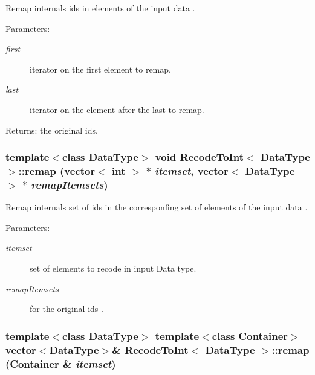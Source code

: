 Remap internals ids in elements of the input data . 

\begin{Desc}
\item[Parameters:]
\begin{description}
\item[{\em first}]iterator on the first element to remap. \item[{\em last}]iterator on the element after the last to remap. \end{description}
\end{Desc}
\begin{Desc}
\item[Returns:]the original ids. \end{Desc}
\subsubsection{\setlength{\rightskip}{0pt plus 5cm}template$<$class Data\-Type$>$ void {\bf Recode\-To\-Int}$<$ Data\-Type $>$::remap (vector$<$ int $>$ $\ast$ {\em itemset}, vector$<$ Data\-Type $>$ $\ast$ {\em remap\-Itemsets})\hspace{0.3cm}{\tt  [inline]}}\label{class_recode_to_int_8dcffed515a66b6a64c837933dca615e}


Remap internals set of ids in the corresponfing set of elements of the input data . 

\begin{Desc}
\item[Parameters:]
\begin{description}
\item[{\em itemset}]set of elements to recode in input Data type. \item[{\em remap\-Itemsets}]for the original ids . \end{description}
\end{Desc}
\subsubsection{\setlength{\rightskip}{0pt plus 5cm}template$<$class Data\-Type$>$ template$<$class Container$>$ vector$<$Data\-Type$>$\& {\bf Recode\-To\-Int}$<$ Data\-Type $>$::remap (Container \& {\em itemset})\hspace{0.3cm}{\tt  [inline]}}\label{class_recode_to_int_814de08675679f300ae7171f560b0e61}



